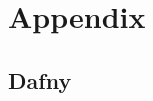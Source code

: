 \documentclass[12pt,openany,a4paper]{book}
\begin{document}
\appendix


\newpage
{}
\mbox{}
\newpage



\chapter{Appendix}

\section{Dafny}


\label {dafnybug1}
\end{document}
